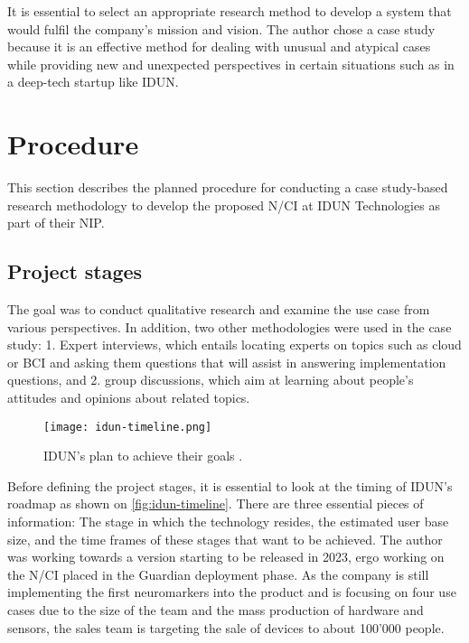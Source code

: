 It is essential to select an appropriate research method to develop a system that would fulfil the company's mission and vision. The author chose a case study because it is an effective method for dealing with unusual and atypical cases while providing new and unexpected perspectives in certain situations such as in a deep-tech startup like IDUN.

\section{Procedure}
\label{chapter3-procedure}

This section describes the planned procedure for conducting a case study-based research methodology to develop the proposed N/CI at IDUN Technologies as part of their NIP.

\subsection{Project stages}
\label{chapter3-project-stages}

The goal was to conduct qualitative research and examine the use case from various perspectives. In addition, two other methodologies were used in the case study: 1. Expert interviews, which entails locating experts on topics such as cloud or BCI and asking them questions that will assist in answering implementation questions, and 2. group discussions, which aim at learning about people's attitudes and opinions about related topics.

\begin{figure}[!ht]
  \centering
  \texttt{[image: idun-timeline.png]}
  \caption[IDUN's plan to achieve their goals]{IDUN's plan to achieve their goals \citep{idun_guardian_nodate}.}
  \label{fig:idun-timeline}
\end{figure}

Before defining the project stages, it is essential to look at the timing of IDUN's roadmap as shown on \autoref{fig:idun-timeline}. There are three essential pieces of information: The stage in which the technology resides, the estimated user base size, and the time frames of these stages that want to be achieved. The author was working towards a version starting to be released in 2023, ergo working on the N/CI placed in the Guardian deployment phase. As the company is still implementing the first neuromarkers into the product and is focusing on four use cases due to the size of the team and the mass production of hardware and sensors, the sales team is targeting the sale of devices to about 100'000 people.

